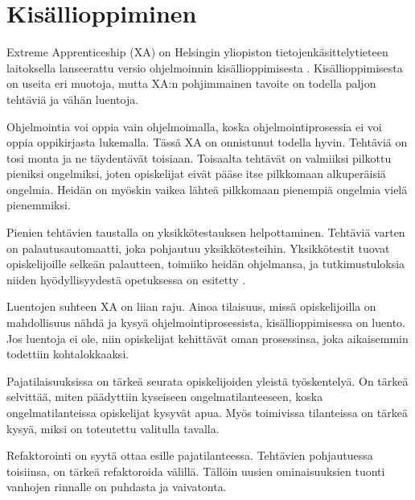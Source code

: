 \section{Kisällioppiminen}

Extreme Apprenticeship (XA) on Helsingin yliopiston tietojenkäsittelytieteen
laitoksella lanseerattu versio ohjelmoinnin kisällioppimisesta
\cite{Vihavainen:2011:EAM:1953163.1953196}. Kisällioppimisesta on useita eri
muotoja, mutta XA:n pohjimmainen tavoite on todella paljon tehtäviä ja vähän
luentoja.

Ohjelmointia voi oppia vain ohjelmoimalla, koska ohjelmointiprosessia ei voi
oppia oppikirjasta lukemalla. Tässä XA on onnistunut todella hyvin. Tehtäviä on
tosi monta ja ne täydentävät toisiaan. Toisaalta tehtävät on valmiiksi pilkottu
pieniksi ongelmiksi, joten opiskelijat eivät pääse itse pilkkomaan alkuperäisiä
ongelmia. Heidän on myöskin vaikea lähteä pilkkomaan pienempiä ongelmia vielä
pienemmiksi.

Pienien tehtävien taustalla on yksikkötestauksen helpottaminen. Tehtäviä varten
on palautusautomaatti, joka pohjautuu yksikkötesteihin. Yksikkötestit tuovat
opiskelijoille selkeän palautteen, toimiiko heidän ohjelmansa, ja
tutkimustuloksia niiden hyödyllisyydestä opetuksessa on esitetty
\cite{Bennedsen:2008}.

Luentojen suhteen XA on liian raju. Ainoa tilaisuus, missä opiskelijoilla on
mahdollisuus nähdä ja kysyä ohjelmointiprosessista, kisällioppimisessa on
luento. Jos luentoja ei ole, niin opiskelijat kehittävät oman prosessinsa, joka
aikaisemmin todettiin kohtalokkaaksi.

Pajatilaisuuksissa on tärkeä seurata opiskelijoiden yleistä työskentelyä. On
tärkeä selvittää, miten päädyttiin kyseiseen ongelmatilanteeseen, koska
ongelmatilanteissa opiskelijat kysyvät apua. Myös toimivissa tilanteissa on
tärkeä kysyä, miksi on toteutettu valitulla tavalla.

Refaktorointi on syytä ottaa esille pajatilanteessa. Tehtävien pohjautuessa
toisiinsa, on tärkeä refaktoroida välillä. Tällöin uusien ominaisuuksien tuonti
vanhojen rinnalle on puhdasta ja vaivatonta.
